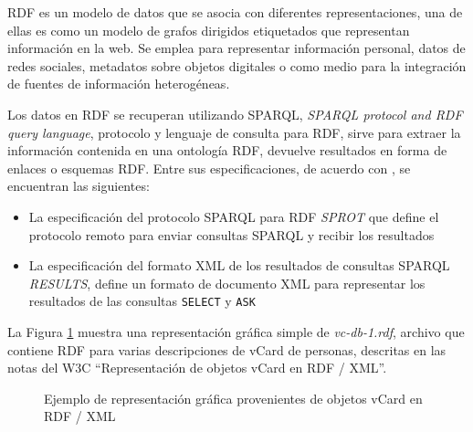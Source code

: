 RDF es un modelo de datos que se asocia con diferentes representaciones, una de ellas es como un modelo de grafos dirigidos etiquetados que representan informaci\'on en la web. Se emplea para representar informaci\'on personal, datos de redes sociales, metadatos sobre objetos digitales o como medio para la integraci\'on de fuentes de informaci\'on heterog\'eneas.\newline

Los datos en RDF se recuperan utilizando SPARQL, \textit{SPARQL protocol and RDF query language}, protocolo y lenguaje de consulta para RDF, sirve para extraer la informaci\'on contenida en una ontolog\'ia RDF, devuelve resultados en forma de enlaces o esquemas RDF. Entre sus especificaciones, de acuerdo con \cite{SkosSparql}, se encuentran las siguientes:

\begin{itemize}
    \item La especificaci\'on del protocolo SPARQL para RDF \textit{SPROT} que define el protocolo remoto para enviar consultas SPARQL y recibir los resultados
    \item La especificaci\'on del formato XML de los resultados de consultas SPARQL \textit{RESULTS}, define un formato de documento XML para representar los resultados de las consultas \texttt{SELECT} y \texttt{ASK} 
\end{itemize}

La Figura \ref{ejemploRDFgrafico} muestra una representaci\'on gr\'afica simple de \textit{vc-db-1.rdf}, archivo que contiene RDF para varias descripciones de vCard de personas, descritas en las notas del W3C ``Representaci\'on de objetos vCard en RDF / XML''.\newline

\begin{figure}[!ht]
    \centering
    \caption{Ejemplo de representaci\'on gr\'afica provenientes de objetos vCard en RDF / XML} 
    \label{ejemploRDFgrafico}
\end{figure}

